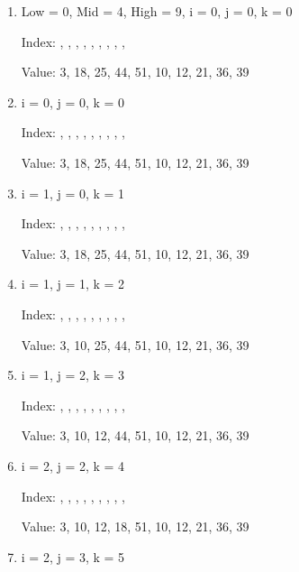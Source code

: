 \documentclass{article}
\begin{document}
\begin{itemize}
    \begin{enumerate}
        \item Low = 0, Mid = 4, High = 9, i = 0, j = 0, k = 0
        
            Index: {, , , , , \space{}, \space{}, , , \space{}}
    
            Value: {3, 18, 25, 44, 51, 10, 12, 21, 36, 39}

        \item i = 0, j = 0, k = 0
        
            Index: {, , , , , \space{}, \space{}, , , \space{}}
    
            Value: {3, 18, 25, 44, 51, 10, 12, 21, 36, 39}

        \item i = 1, j = 0, k = 1
        
            Index: {, , , , , \space{}, \space{}, , , \space{}}
    
            Value: {3, 18, 25, 44, 51, 10, 12, 21, 36, 39}

        \item i = 1, j = 1, k = 2
        
            Index: {, , , , , \space{}, \space{}, , , \space{}}
    
            Value: {3, 10, 25, 44, 51, 10, 12, 21, 36, 39}

        \item i = 1, j = 2, k = 3
        
            Index: {, , , , , \space{}, \space{}, , , \space{}}
    
            Value: {3, 10, 12, 44, 51, 10, 12, 21, 36, 39}

        \item i = 2, j = 2, k = 4
        
            Index: {, , , , , \space{}, \space{}, , , \space{}}
    
            Value: {3, 10, 12, 18, 51, 10, 12, 21, 36, 39}

        \item i = 2, j = 3, k = 5
        

\end{enumerate}
\end{itemize}
\end{document}
